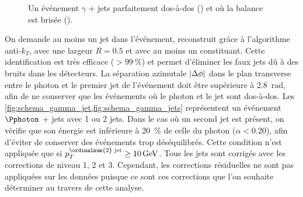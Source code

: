 \begin{figure}[tbp]
{{}}
  \caption{Un événement $\gamma$ + jets parfaitement dos-à-dos () et où la balance est brisée ().}
  \label{fig:schema_g_jet}
\end{figure}

On demande au moins un jet dans l'événement, reconstruit grâce à l'algorithme anti-$k_T$, avec une largeur $R = \num{0.5}$ et avec au moins un constituant. Cette identification est très efficace ($> \SI{99}{\%}$) et permet d'éliminer les faux jets dû à des bruits dans les détecteurs. La séparation azimutale $\lvert \Delta \phi \rvert$ dans le plan transverse entre le photon et le premier jet de l'événement doit être supérieure à \SI{2.8}{\radian}, afin de ne conserver que les événements où le photon et le jet sont dos-à-dos. Les \cref{fig:schema_gamma_jet,fig:schema_gamma_jets} représentent un événement $\Pphoton$ + jets avec 1 ou 2 jets. Dans le cas où un second jet est présent, on vérifie que son énergie est inférieure à \SI{20}{\%} de celle du photon ($\alpha < \num{0.20}$), afin d'éviter de conserver des événements trop déséquilibrés. Cette condition n'est appliquée que si $p_T^{\text{\ordinalnum{2} jet}} \geq \SI{10}{\GeV}$. Tous les jets sont corrigés avec les corrections de niveau 1, 2 et 3. Cependant, les corrections résiduelles ne sont pas appliquées sur les données puisque ce sont ces corrections que l'on souhaite déterminer au travers de cette analyse.

